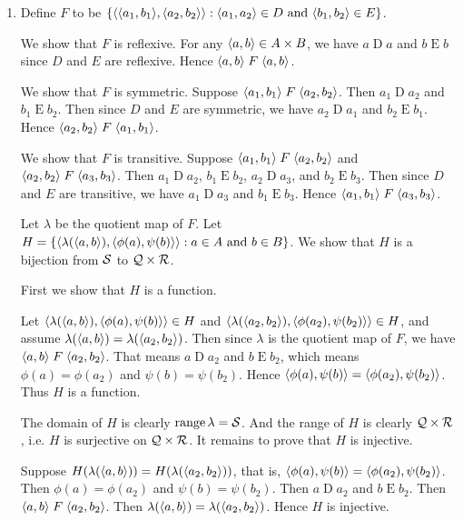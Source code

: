 \begin{solution}
\begin{enumerate}[label=(\alph*)]
    \item Define $F$ to be $\setb{\aprn{\aprn{a_1,b_1},\aprn{a_2,b_2}}}{\aprn{a_1,a_2}\in D\land \aprn{b_1,b_2}\in E}$.

    We show that $F$ is reflexive. For any $\left\langle a,b\right\rangle\in A\times B$, we have $a\mathrel D a$ and $b\mathrel E b$
    since $D$ and $E$ are reflexive. Hence $\left\langle a,b\right\rangle\mathrel F \left\langle a,b\right\rangle$.

    We show that $F$ is symmetric. Suppose
    $\left\langle a_1,b_1\right\rangle\mathrel F \left\langle a_2,b_2\right\rangle$. Then $a_1\mathrel D a_2$ and $b_1\mathrel E b_2$.
    Then since $D$ and $E$ are symmetric, we have $a_2\mathrel D a_1$ and $b_2\mathrel E b_1$.
    Hence $\left\langle a_2,b_2\right\rangle\mathrel F \left\langle a_1,b_1\right\rangle$.

    We show that $F$ is transitive. Suppose
    $\left\langle a_1,b_1\right\rangle\mathrel F \left\langle a_2,b_2\right\rangle$ and $\left\langle a_2,b_2\right\rangle\mathrel F \left\langle a_3,b_3\right\rangle$.
    Then $a_1\mathrel D a_2$, $b_1\mathrel E b_2$, $a_2\mathrel D a_3$, and $b_2\mathrel E b_3$.
    Then since $D$ and $E$ are transitive, we have $a_1\mathrel D a_3$ and $b_1\mathrel E b_3$.
    Hence $\left\langle a_1,b_1\right\rangle\mathrel F \left\langle a_3,b_3\right\rangle$.

    Let $\lambda$ be the quotient map of $F$.
    Let $H=\left\{ \left\langle\lambda(\left\langle a,b\right\rangle),\left\langle\phi(a),\psi(b)\right\rangle\right\rangle : a\in A\text{ and } b\in B \right\}$.
    We show that $H$ is a bijection
    from $\mathcal{S}$ to $\mathcal{Q}\times \mathcal{R}$.

    First we show that $H$ is a function.
    
    Let $\left\langle\lambda(\left\langle a,b\right\rangle),\left\langle\phi(a),\psi(b)\right\rangle\right\rangle\in H$ and
    $\left\langle\lambda(\left\langle a_2,b_2\right\rangle),\left\langle\phi(a_2),\psi(b_2)\right\rangle\right\rangle\in H$,
    and assume $\lambda(\left\langle a,b\right\rangle)=\lambda(\left\langle a_2,b_2\right\rangle)$.
    Then since $\lambda$ is the quotient map of $F$, we have $\left\langle a,b\right\rangle\mathrel F \left\langle a_2,b_2\right\rangle$.
    That means $a\mathrel D a_2$ and $b\mathrel E b_2$, which means $\phi(a)=\phi(a_2)$ and $\psi(b)=\psi(b_2)$.
    Hence $\left\langle\phi(a),\psi(b)\right\rangle=\left\langle\phi(a_2),\psi(b_2)\right\rangle$. Thus $H$ is a function.

    The domain of $H$ is clearly $\operatorname{range}\lambda=\mathcal{S}$. And the range of $H$ is clearly $\mathcal{Q}\times \mathcal{R}$, i.e.
    $H$ is surjective on $\mathcal{Q}\times \mathcal{R}$. It remains to prove that $H$ is injective.

    Suppose $H(\lambda(\left\langle a,b\right\rangle))=H(\lambda(\left\langle a_2,b_2\right\rangle))$, that is, $\left\langle\phi(a),\psi(b)\right\rangle=\left\langle\phi(a_2),\psi(b_2)\right\rangle$.
    Then $\phi(a)=\phi(a_2)$ and $\psi(b)=\psi(b_2)$.
    Then $a\mathrel D a_2$ and $b\mathrel E b_2$.
    Then $\left\langle a,b\right\rangle\mathrel F \left\langle a_2,b_2\right\rangle$.
    Then $\lambda(\left\langle a,b\right\rangle)=\lambda(\left\langle a_2,b_2\right\rangle)$. Hence $H$ is injective.


\end{enumerate}
\end{solution}
